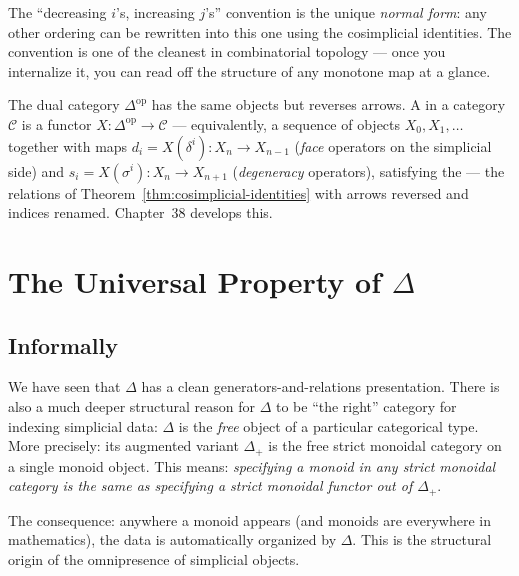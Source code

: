 \begin{remark}
The ``decreasing $i$'s, increasing $j$'s'' convention is the unique
\emph{normal form}: any other ordering can be rewritten into this one
using the cosimplicial identities. The convention is one of the cleanest
in combinatorial topology — once you internalize it, you can read off
the structure of any monotone map at a glance.
\end{remark}

\begin{remark}
The dual category $\Delta^{\mathrm{op}}$ has the same objects but reverses
arrows. A  in a category $\mathcal{C}$ is a
functor $X : \Delta^{\mathrm{op}} \to \mathcal{C}$ — equivalently, a
sequence of objects $X_0, X_1, \ldots$ together with maps $d_i =
X(\delta^i) : X_n \to X_{n-1}$ (\emph{face} operators on the simplicial
side) and $s_i = X(\sigma^i) : X_n \to X_{n+1}$ (\emph{degeneracy}
operators), satisfying the  — the relations
of Theorem~\ref{thm:cosimplicial-identities} with arrows reversed and
indices renamed. Chapter~38 develops this.
\end{remark}


\section{The Universal Property of $\Delta$}
\label{sec:universal}

\subsection{Informally}

We have seen that $\Delta$ has a clean generators-and-relations
presentation. There is also a much deeper structural reason for $\Delta$
to be ``the right'' category for indexing simplicial data: $\Delta$ is
the \emph{free} object of a particular categorical type. More precisely:
its augmented variant $\Delta_+$ is the free strict monoidal category
on a single monoid object. This means: \emph{specifying a monoid in
\emph{any} strict monoidal category is the same as specifying a strict
monoidal functor out of $\Delta_+$}.

The consequence: anywhere a monoid appears (and monoids are everywhere
in mathematics), the data is automatically organized by $\Delta$. This
is the structural origin of the omnipresence of simplicial objects.

